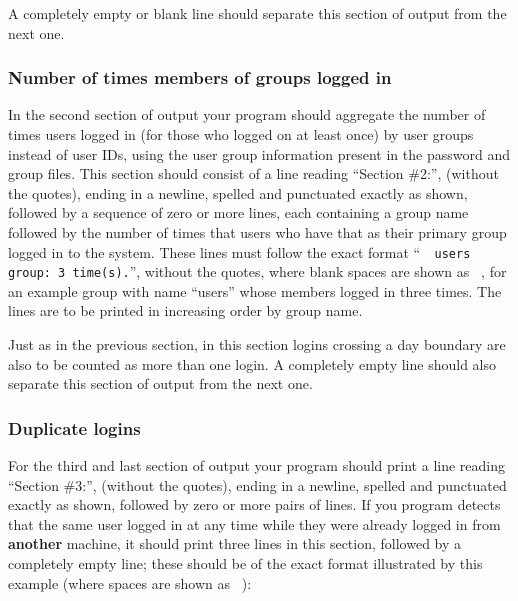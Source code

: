 \documentclass[11pt]{article}
\begin{document}
        A completely empty or blank line should separate this section of
      output from the next one.

      \subsubsection{Number of times members of groups logged in}

        In the second section of output your program should aggregate the
      number of times users logged in (for those who logged on at least once)
      by user groups instead of user IDs, using the user group information
      present in the password and group files.  This section should consist
      of a line reading ``Section \#2:'', (without the quotes), ending in a
      newline, spelled and punctuated exactly as shown, followed by a
      sequence of zero or more lines, each containing a group name followed
      by the number of times that users who have that as their primary group
      logged in to the system.  These lines must follow the exact format
      ``\verb*@  users group: 3 time(s).@'', without the quotes, where blank
      spaces are shown as \verb*@ @, for an example group with name ``users''
      whose members logged in three times.  The lines are to be printed in
      increasing order by group name.

        Just as in the previous section, in this section logins crossing a day
      boundary are also to be counted as more than one login.  A completely
      empty line should also separate this section of output from the next
      one.

      \subsubsection{Duplicate logins}

        For the third and last section of output your program should print a
      line reading ``Section \#3:'', (without the quotes), ending in a
      newline, spelled and punctuated exactly as shown, followed by zero or
      more pairs of lines.  If you program detects that the same user logged
      in at any time while they were already logged in from \textbf{another}
      machine, it should print three lines in this section, followed by a
      completely empty line; these should be of the exact format
      illustrated by this example (where spaces are shown as \verb*@ @):

        \medskip
\end{document}
